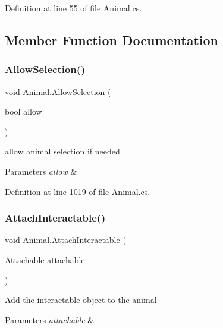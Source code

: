 Definition at line 55 of file Animal.\+cs.



\subsection{Member Function Documentation}
\mbox{\label{class_animal_ac8b6cc0e6eb0a6cb509cf4d562745e36}} 
\subsubsection{\texorpdfstring{Allow\+Selection()}{AllowSelection()}}
{\footnotesize\ttfamily void Animal.\+Allow\+Selection (\begin{DoxyParamCaption}\item[{bool}]{allow }\end{DoxyParamCaption})}



allow animal selection if needed 


\begin{DoxyParams}{Parameters}
{\em allow} & \\
\hline
\end{DoxyParams}


Definition at line 1019 of file Animal.\+cs.

\mbox{\label{class_animal_a2ca4f870282a91496124d13b351e8415}} 
\subsubsection{\texorpdfstring{Attach\+Interactable()}{AttachInteractable()}}
{\footnotesize\ttfamily void Animal.\+Attach\+Interactable (\begin{DoxyParamCaption}\item[{\mbox{\hyperlink{class_attachable}{Attachable}}}]{attachable }\end{DoxyParamCaption})}



Add the interactable object to the animal 


\begin{DoxyParams}{Parameters}
{\em attachable} & \\
\hline
\end{DoxyParams}


